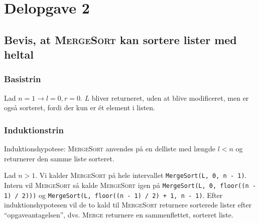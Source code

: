 \section{Delopgave 2}\label{sec:delopgave-23}

\subsection{Bevis, at \textsc{MergeSort} kan sortere lister med heltal}
\label{subsec:bevis-at-mergesort-kan-sortere-lister-med-heltal}

\subsubsection{Basistrin}

Lad \(n = 1 \rightarrow l = 0, r = 0\).
\(L\) bliver returneret, uden at blive modificeret, men er også sorteret, fordi der kun er ét element i listen.

\subsubsection{Induktionstrin}

Induktionshypotese: \textsc{MergeSort} anvendes på en delliste med længde \(l < n\) og returnerer den samme liste
sorteret.

Lad \(n > 1\).
Vi kalder \textsc{MergeSort} på hele intervallet \lstinline{MergeSort(L, 0, n - 1)}.
Intern vil \textsc{MergeSort} så kalde \textsc{MergeSort} igen på \lstinline{MergeSort(L, 0, floor((n - 1) / 2)))} og
\lstinline{MergeSort(L, floor((n - 1) / 2) + 1, n - 1)}.
Efter induktionshypotesen vil de to kald til \textsc{MergeSort} returnere sorterede lister efter ``opgaveantagelsen'',
dvs.
\textsc{Merge} returnere en sammenflettet, sorteret liste.
